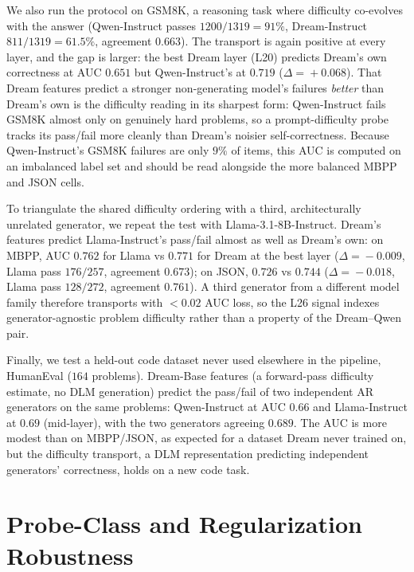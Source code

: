 \documentclass[11pt]{article}
\begin{document}
We also run the protocol on GSM8K, a reasoning task where difficulty co-evolves with the answer (Qwen-Instruct passes $1200/1319\!=\!91\%$, Dream-Instruct $811/1319\!=\!61.5\%$, agreement $0.663$).
The transport is again positive at every layer, and the gap is larger: the best Dream layer (L20) predicts Dream's own correctness at AUC $0.651$ but Qwen-Instruct's at $0.719$ ($\Delta\!=\!+0.068$).
That Dream features predict a stronger non-generating model's failures \emph{better} than Dream's own is the difficulty reading in its sharpest form: Qwen-Instruct fails GSM8K almost only on genuinely hard problems, so a prompt-difficulty probe tracks its pass/fail more cleanly than Dream's noisier self-correctness.
Because Qwen-Instruct's GSM8K failures are only $9\%$ of items, this AUC is computed on an imbalanced label set and should be read alongside the more balanced MBPP and JSON cells.

To triangulate the shared difficulty ordering with a third, architecturally unrelated generator, we repeat the test with Llama-3.1-8B-Instruct.
Dream's features predict Llama-Instruct's pass/fail almost as well as Dream's own: on MBPP, AUC $0.762$ for Llama vs $0.771$ for Dream at the best layer ($\Delta\!=\!-0.009$, Llama pass $176/257$, agreement $0.673$); on JSON, $0.726$ vs $0.744$ ($\Delta\!=\!-0.018$, Llama pass $128/272$, agreement $0.761$).
A third generator from a different model family therefore transports with $<\!0.02$ AUC loss, so the L26 signal indexes generator-agnostic problem difficulty rather than a property of the Dream--Qwen pair.

Finally, we test a held-out code dataset never used elsewhere in the pipeline, HumanEval ($164$ problems).
Dream-Base features (a forward-pass difficulty estimate, no DLM generation) predict the pass/fail of two independent AR generators on the same problems: Qwen-Instruct at AUC $0.66$ and Llama-Instruct at $0.69$ (mid-layer), with the two generators agreeing $0.689$.
The AUC is more modest than on MBPP/JSON, as expected for a dataset Dream never trained on, but the difficulty transport, a DLM representation predicting independent generators' correctness, holds on a new code task.

\section{Probe-Class and Regularization Robustness}
\label{sec:appendix_proberobust}
\end{document}
